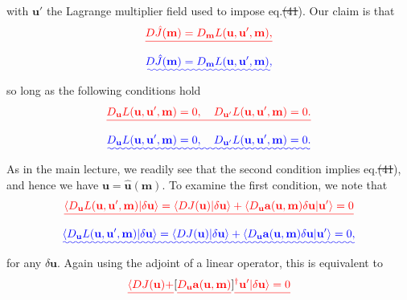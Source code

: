\documentclass[a4paper,12pt]{paper}
\providecommand{\DIFadd}[1]{{\protect\color{blue}\uwave{#1}}} %
\providecommand{\DIFdel}[1]{{\protect\color{red}\sout{#1}}}                      %
\providecommand{\DIFaddbegin}{} %
\providecommand{\DIFaddend}{} %
\providecommand{\DIFdelbegin}{} %
\providecommand{\DIFdelend}{} %
\begin{document}
with $\mathbf{u}'$ the Lagrange multiplier field used to impose eq.\DIFdelbegin \DIFdel{(41}\DIFdelend \DIFaddbegin \DIFadd{~(\ref{eq:45}}\DIFaddend ). Our claim is that
\DIFdelbegin \begin{displaymath}
\DIFdel{D\hat{J}(\mathbf{m})=D_{\mathbf{m}}L(\mathbf{u},\mathbf{u}',\mathbf{m}),
}\end{displaymath}%
\DIFdelend \DIFaddbegin \begin{equation}
\DIFadd{D\hat{J}(\mathbf{m})=D_{\mathbf{m}}L(\mathbf{u},\mathbf{u}',\mathbf{m}),
\label{eq:56}
}\end{equation}\DIFaddend 
so long as the following conditions hold
\DIFdelbegin \begin{displaymath}
\DIFdel{D_{\mathbf{u}}L(\mathbf{u},\mathbf{u}',\mathbf{m})=0, \quad D_{\mathbf{u}'}L(\mathbf{u},\mathbf{u}',\mathbf{m})=0.
}\end{displaymath}%
\DIFdelend \DIFaddbegin \begin{equation}
\DIFadd{D_{\mathbf{u}}L(\mathbf{u},\mathbf{u}',\mathbf{m})=0, \quad D_{\mathbf{u}'}L(\mathbf{u},\mathbf{u}',\mathbf{m})=0.
\label{eq:57}
}\end{equation}\DIFaddend 
As in the main lecture, we readily see that the second condition implies eq.\DIFdelbegin \DIFdel{(41}\DIFdelend \DIFaddbegin \DIFadd{~(\ref{eq:45}}\DIFaddend ), and hence we have
 $\mathbf{u}=\hat{\mathbf{u}}(\mathbf{m})$. To examine the first condition, we note that
\DIFdelbegin \begin{displaymath}
\DIFdel{\langle D_{\mathbf{u}}L(\mathbf{u},\mathbf{u}',\mathbf{m})|\delta \mathbf{u}\rangle=\langle 
    DJ(\mathbf{u})|\delta \mathbf{u}\rangle+\langle D_{\mathbf{u}}\mathbf{a}(\mathbf{u},\mathbf{m})\delta \mathbf{u}|\mathbf{u}'\rangle=0
}\end{displaymath}%
\DIFdelend \DIFaddbegin \begin{equation}
\DIFadd{\langle D_{\mathbf{u}}L(\mathbf{u},\mathbf{u}',\mathbf{m})|\delta \mathbf{u}\rangle=\langle 
    DJ(\mathbf{u})|\delta \mathbf{u}\rangle+\langle D_{\mathbf{u}}\mathbf{a}(\mathbf{u},\mathbf{m})\delta \mathbf{u}|\mathbf{u}'\rangle=0,
\label{eq:58}
}\end{equation}\DIFaddend 
for any $\delta \mathbf{u}$. Again using the adjoint of a linear operator, this is equivalent to
\DIFdelbegin \begin{displaymath}
\DIFdel{\langle DJ(\mathbf{u})+}[\DIFdel{D_{\mathbf{u}}\mathbf{a}(\mathbf{u},\mathbf{m})}]\DIFdel{^{\dagger}\mathbf{u}'|\delta \mathbf{u}\rangle=0
}\end{displaymath}%
\end{document}
